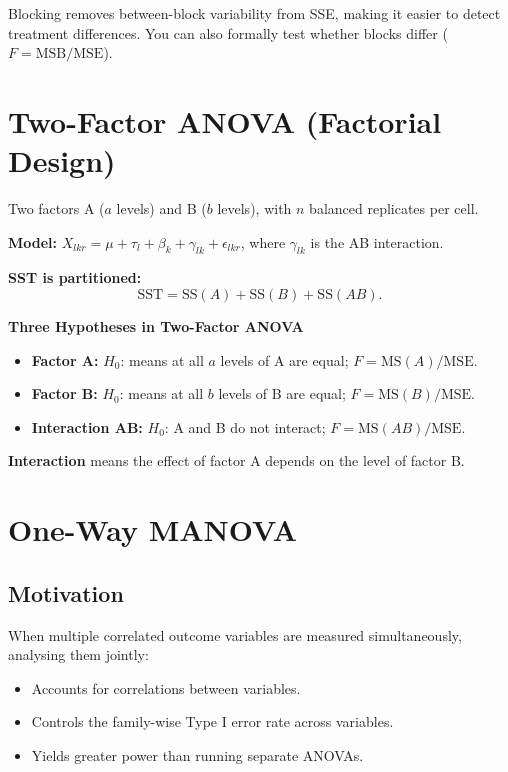 \documentclass[12pt, a4paper]{article}
\begin{document}
Blocking removes between-block variability from SSE, making it easier to detect treatment differences. You can also formally test whether blocks differ ($F = \text{MSB}/\text{MSE}$).

\section{Two-Factor ANOVA (Factorial Design)}

Two factors A ($a$ levels) and B ($b$ levels), with $n$ balanced replicates per cell.

\textbf{Model:} $X_{lkr} = \mu + \tau_l + \beta_k + \gamma_{lk} + \epsilon_{lkr}$, where $\gamma_{lk}$ is the AB interaction.

\textbf{SST is partitioned:}
\[
  \text{SST} = \text{SS}(A) + \text{SS}(B) + \text{SS}(AB).
\]

\begin{keybox}\noindent\textbf{Three Hypotheses in Two-Factor ANOVA}\par\smallskip
\begin{itemize}
  \item \textbf{Factor A:} $H_0$: means at all $a$ levels of A are equal; $F = \text{MS}(A)/\text{MSE}$.
  \item \textbf{Factor B:} $H_0$: means at all $b$ levels of B are equal; $F = \text{MS}(B)/\text{MSE}$.
  \item \textbf{Interaction AB:} $H_0$: A and B do not interact; $F = \text{MS}(AB)/\text{MSE}$.
\end{itemize}
\end{keybox}

\textbf{Interaction} means the effect of factor A depends on the level of factor B.

\section{One-Way MANOVA}

\subsection{Motivation}

When multiple correlated outcome variables are measured simultaneously, analysing them jointly:
\begin{itemize}
  \item Accounts for correlations between variables.
  \item Controls the family-wise Type I error rate across variables.
  \item Yields greater power than running separate ANOVAs.
\end{itemize}
\end{document}
